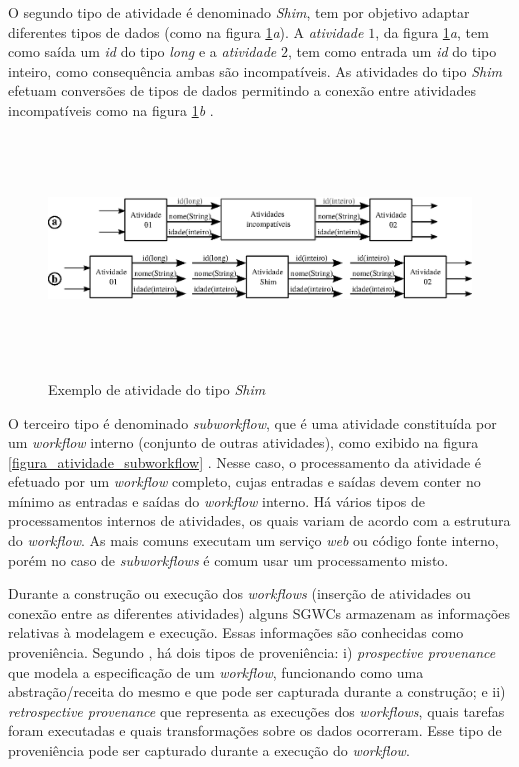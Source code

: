 O segundo tipo de atividade é denominado \emph{Shim}, tem por objetivo adaptar diferentes tipos de dados (como na figura \ref{figura_atividade_shim}\emph{a}). A \emph{atividade} \(1\), da figura \ref{figura_atividade_shim}\emph{a}, tem como saída um \emph{id} do tipo \emph{long} e a \emph{atividade} \(2\), tem como entrada um \emph{id} do tipo inteiro, como consequência ambas são incompatíveis. As atividades do tipo \emph{Shim} efetuam conversões de tipos de dados permitindo a conexão entre atividades incompatíveis como na figura \ref{figura_atividade_shim}\emph{b} \cite{Lin2009}.

\begin{figure}[!htp]
    \centering  
    \caption{Exemplo de atividade do tipo \emph{Shim}}
    \includegraphics[width=13cm,height=6cm]{./secoes/conceitosFundamentais/pics/img/Shim.eps}    
	\label{figura_atividade_shim}
	\vspace{0.1cm}
	\source{\varAutorData}
\end{figure}

O terceiro tipo é denominado \emph{subworkflow}, que é uma atividade constituída por um \emph{workflow} interno (conjunto de outras atividades), como exibido na figura \ref{figura_atividade_subworkflow} \cite{Medeiros2005}. Nesse caso, o processamento da atividade é efetuado por um \emph{workflow} completo, cujas entradas e saídas devem conter no mínimo as entradas e saídas do \emph{workflow} interno. Há vários tipos de processamentos internos de atividades, os quais variam de acordo com a estrutura do \emph{workflow}. As mais comuns executam um serviço \emph{web} ou código fonte interno, porém no caso de \emph{subworkflows} é comum usar um processamento misto. 

Durante a construção ou execução dos \emph{workflows} (inserção de atividades ou conexão entre as diferentes atividades) alguns SGWCs armazenam as informações relativas à modelagem e execução. Essas informações são conhecidas como proveniência. Segundo , há dois tipos de proveniência: i) \emph{prospective provenance} que modela a especificação de um \emph{workflow}, funcionando como uma abstração/receita do mesmo e que pode ser capturada durante a construção; e ii) \emph{retrospective provenance} que representa as execuções dos \emph{workflows}, quais tarefas foram executadas e quais transformações sobre os dados ocorreram. Esse tipo de proveniência pode ser capturado durante a execução do \emph{workflow}.

